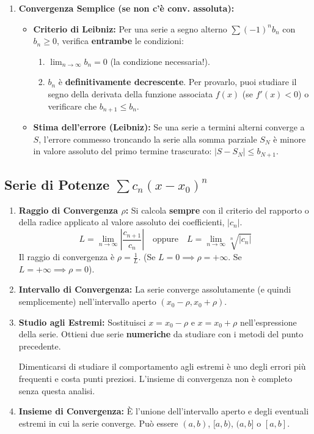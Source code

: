 \documentclass[a4paper, 12pt]{article}
\begin{document}
\begin{enumerate}
    \item \textbf{Convergenza Semplice (se non c'è conv. assoluta):}
    \begin{itemize}
        \item \textbf{Criterio di Leibniz:} Per una serie a segno alterno $\sum (-1)^n b_n$ con $b_n \ge 0$, verifica \textbf{entrambe} le condizioni: 
        \begin{enumerate}
            \item $\lim_{n \to \infty} b_n = 0$ (la condizione necessaria!). 
            \item $b_n$ è \textbf{definitivamente decrescente}. Per provarlo, puoi studiare il segno della derivata della funzione associata $f(x)$ (se $f'(x) < 0$) o verificare che $b_{n+1} \le b_n$. 
        \end{enumerate}
        \item \textbf{Stima dell'errore (Leibniz):} Se una serie a termini alterni converge a $S$, l'errore commesso troncando la serie alla somma parziale $S_N$ è minore in valore assoluto del primo termine trascurato: $|S - S_N| \le b_{N+1}$. 
    \end{itemize}
\end{enumerate}

\subsection{Serie di Potenze \texorpdfstring{$\sum c_n (x-x_0)^n$}{Serie di Potenze}}
\begin{enumerate}
    \item \textbf{Raggio di Convergenza $\rho$:} Si calcola \textbf{sempre} con il criterio del rapporto o della radice applicato al valore assoluto dei coefficienti, $|c_n|$. 
    \[ L = \lim_{n \to \infty} \left|\frac{c_{n+1}}{c_n}\right| \quad \text{oppure} \quad L = \lim_{n \to \infty} \sqrt[n]{|c_n|} \]
    Il raggio di convergenza è $\rho = \frac{1}{L}$. (Se $L=0 \implies \rho=+\infty$. Se $L=+\infty \implies \rho=0$). 
    \item \textbf{Intervallo di Convergenza:} La serie converge assolutamente (e quindi semplicemente) nell'intervallo aperto $(x_0 - \rho, x_0 + \rho)$. 
    \item \textbf{Studio agli Estremi:} Sostituisci $x = x_0 - \rho$ e $x = x_0 + \rho$ nell'espressione della serie. Ottieni due serie \textbf{numeriche} da studiare con i metodi del punto precedente. 
    \begin{errore}
    Dimenticarsi di studiare il comportamento agli estremi è uno degli errori più frequenti e costa punti preziosi. L'insieme di convergenza non è completo senza questa analisi. 
    \end{errore}
    \item \textbf{Insieme di Convergenza:} È l'unione dell'intervallo aperto e degli eventuali estremi in cui la serie converge. Può essere $(a,b)$, $[a,b)$, $(a,b]$ o $[a,b]$. 
\end{enumerate}
\end{document}
